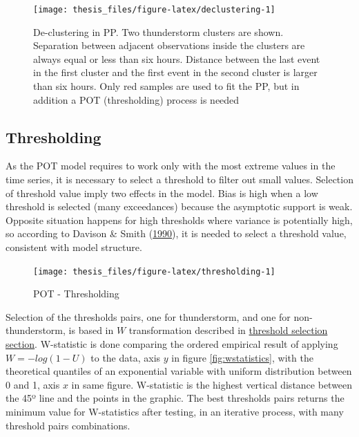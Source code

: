 \documentclass[12pt,oneside]{reedthesis}
\begin{document}
\footnotesize
\begin{figure}

{\centering \texttt{[image: thesis\_files/figure-latex/declustering-1]} 

}

\caption{De-clustering in PP. Two thunderstorm clusters are shown. Separation between adjacent observations inside the clusters are always equal or less than six hours. Distance between the last event in the first cluster and the first event in the second cluster is larger than six hours. Only red samples are used to fit the PP, but in addition a POT (thresholding) process is needed}\label{fig:declustering}
\end{figure}
\normalsize

\hypertarget{thresholding}{%
\subsection{Thresholding}\label{thresholding}}

As the POT model requires to work only with the most extreme values in the time series, it is necessary to select a threshold to filter out small values. Selection of threshold value imply two effects in the model. Bias is high when a low threshold is selected (many exceedances) because the asymptotic support is weak. Opposite situation happens for high thresholds where variance is potentially high, so according to Davison \& Smith (\protect\hyperlink{ref-Davison1990}{1990}), it is needed to select a threshold value, consistent with model structure.

\footnotesize
\begin{figure}

{\centering \texttt{[image: thesis\_files/figure-latex/thresholding-1]} 

}

\caption{POT - Thresholding}\label{fig:thresholding}
\end{figure}
\normalsize

Selection of the thresholds pairs, one for thunderstorm, and one for non-thunderstorm, is based in \(W\) transformation described in \protect\hyperlink{thresholdselection}{threshold selection section}. W-statistic is done comparing the ordered empirical result of applying \(W = -log(1-U)\) to the data, axis \(y\) in figure \ref{fig:wstatistics}, with the theoretical quantiles of an exponential variable with uniform distribution between 0 and 1, axis \(x\) in same figure. W-statistic is the highest vertical distance between the 45º line and the points in the graphic. The best thresholds pairs returns the minimum value for W-statistics after testing, in an iterative process, with many threshold pairs combinations.
\end{document}
